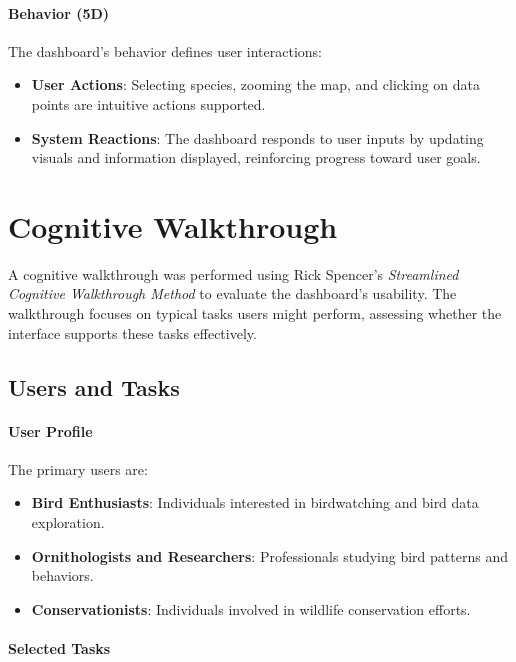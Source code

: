 \paragraph{Behavior (5D)}

The dashboard's behavior defines user interactions:

\begin{itemize} 
    \item \textbf{User Actions}: Selecting species, zooming the map, and clicking on data points are intuitive actions supported. 
    \item \textbf{System Reactions}: The dashboard responds to user inputs by updating visuals and information displayed, reinforcing progress toward user goals. 
\end{itemize}

\section{Cognitive Walkthrough}

A cognitive walkthrough was performed using Rick Spencer's \textit{Streamlined Cognitive Walkthrough Method} \cite{spencerStreamlinedCognitiveWalkthrough2000} to evaluate the dashboard's usability. The walkthrough focuses on typical tasks users might perform, assessing whether the interface supports these tasks effectively.

\subsection{Users and Tasks}

\paragraph{User Profile}

The primary users are:

\begin{itemize} 
    \item \textbf{Bird Enthusiasts}: Individuals interested in birdwatching and bird data exploration. 
    \item 
    \textbf{Ornithologists and Researchers}: Professionals studying bird patterns and behaviors. 
    \item \textbf{Conservationists}: Individuals involved in wildlife conservation efforts. 
\end{itemize}

\paragraph{Selected Tasks}

